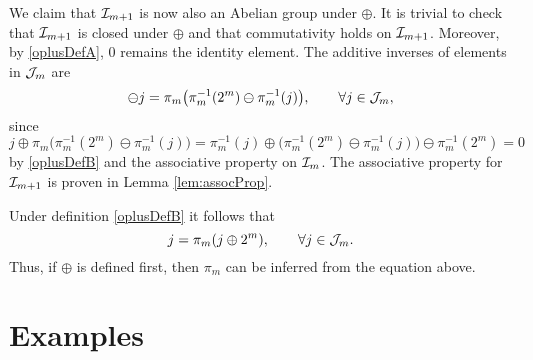 \documentclass[12pt]{amsart}
\begin{document}
We claim that $\mathcal{I}_{m+1}$ is now also an Abelian group under $\oplus$.  It is trivial to check that $\mathcal{I}_{m+1}$ is closed under $\oplus$ and that commutativity holds on $\mathcal{I}_{m+1}$.  Moreover, by \eqref{oplusDefA}, $0$ remains the identity element.  The additive inverses of elements in $\mathcal{J}_m$ are 
\begin{equation}
    \ominus j = \pi_m\bigl (\pi_m^{-1}(2^m) \ominus \pi_m^{-1}(j) \bigr ) , \qquad \forall j \in \mathcal{J}_m,
\end{equation}
since 
\[
j \oplus \pi_m\bigl (\pi_m^{-1}(2^m) \ominus \pi_m^{-1}(j)  \bigr ) = \pi_m^{-1}( j) \oplus \bigl ( \pi_m^{-1}(2^m) \ominus \pi_m^{-1}(j) \bigr ) \ominus \pi_m^{-1}(2^m) = 0
\]
by  \eqref{oplusDefB} and the associative property on $\mathcal{I}_m$.  The associative property for $\mathcal{I}_{m+1}$ is proven in Lemma \ref{lem:assocProp}.



Under definition \eqref{oplusDefB} it follows that 
\begin{equation*}
    j = \pi_m(j \oplus 2^m),  \qquad \forall j \in \mathcal{J}_m.
\end{equation*}
Thus, if $\oplus$ is defined first, then $\pi_m$ can be inferred from the equation above.



\section{Examples}
\end{document}
